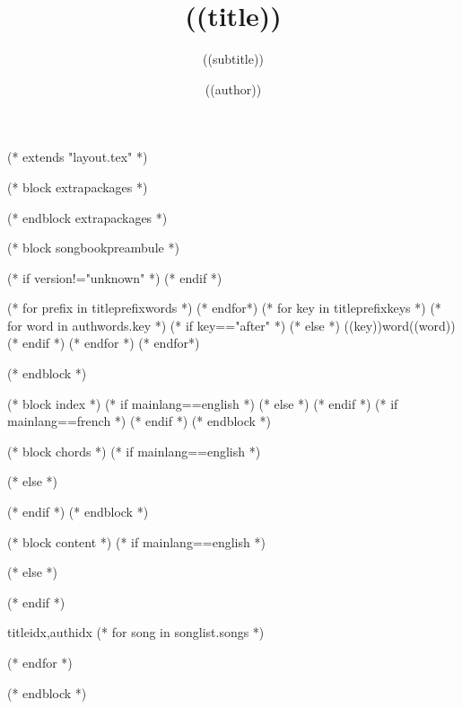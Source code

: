 (* extends "layout.tex" *)

(* block extrapackages *)
   \usepackage[
     a4paper %
     ,includeheadfoot %
     ,hmarginratio=1:1 %
     ,outer=1.8cm %
     ,vmarginratio=1:1 %
     ,bmargin=1.3cm %
     ]{geometry}
  \usepackage{chords}
(* endblock extrapackages *)

(* block songbookpreambule *)
   \title{((title))}
   \author{((author))}
   \subtitle{((subtitle))}
   (* if version!="unknown" *)
   (* endif *)


   (* for prefix in titleprefixwords *)
   (* endfor*)
   (* for key in titleprefixkeys *)
      (* for word in authwords.key *)
      (* if key=="after" *)
      (* else *)
      \auth((key))word{((word))}
      (* endif *)
      (* endfor *)
   (* endfor*)

   \graphicspath{{((datadir))/img/}}
   \pagestyle{empty}


   \renewcommand{\snumbgcolor}{SongNumberBgColor}
   \renewcommand{\notebgcolor}{NoteBgColor}
   \renewcommand{\idxbgcolor}{IndexBgColor}
(* endblock *)

(* block index *)
   (* if mainlang==english *)
   (* else *)
   (* endif *)
   (* if mainlang==french *)
   (* endif *)
(* endblock *)

(* block chords *)
   \ifchorded
   (* if mainlang==english *)
   (* else *)
   (* endif *)
   \chords
   \fi
(* endblock *)

(* block content *)
   (* if mainlang==english *)
   (* else *)
   (* endif *)

   \begin{songs}{titleidx,authidx}
      (* for song in songlist.songs *)
      
      (* endfor *)
   \end{songs}
(* endblock *)
